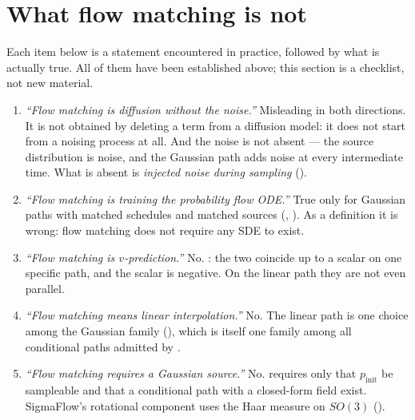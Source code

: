 \documentclass[11pt,a4paper]{report}
\theoremstyle{definition}
\theoremstyle{remark}
\begin{document}
\section{What flow matching is not}
\label{sec:fm-misconceptions}

Each item below is a statement encountered in practice, followed by what is
actually true. All of them have been established above; this section is a
checklist, not new material.

\begin{enumerate}
\item \emph{``Flow matching is diffusion without the noise.''}
      Misleading in both directions. It is not obtained by deleting a term
      from a diffusion model: it does not start from a noising process at
      all. And the noise is not absent --- the source distribution is noise,
      and the Gaussian path adds noise at every intermediate time. What is
      absent is \emph{injected noise during sampling}
      ().

\item \emph{``Flow matching is training the probability flow ODE.''}
      True only for Gaussian paths with matched schedules and matched
      sources (, ).
      As a definition it is wrong: flow matching does not require any SDE
      to exist.

\item \emph{``Flow matching is $v$-prediction.''}
      No. : the two coincide up to a scalar on one
      specific path, and the scalar is negative. On the linear path they
      are not even parallel.

\item \emph{``Flow matching means linear interpolation.''}
      No. The linear path is one choice among the Gaussian family
      (), which is itself one family among all
      conditional paths admitted by .

\item \emph{``Flow matching requires a Gaussian source.''}
      No.  requires only that
      $p_{\mathrm{init}}$ be sampleable and that a conditional path with a
      closed-form field exist. SigmaFlow's rotational component uses the
      Haar measure on $SO(3)$ ().


\end{enumerate}
\end{document}

